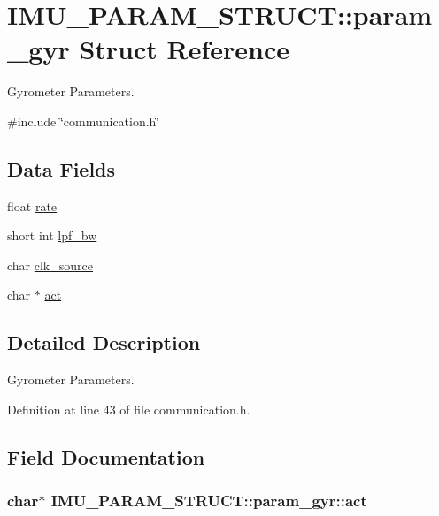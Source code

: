 \hypertarget{structIMU__PARAM__STRUCT_1_1param__gyr}{\section{I\-M\-U\-\_\-\-P\-A\-R\-A\-M\-\_\-\-S\-T\-R\-U\-C\-T\-:\-:param\-\_\-gyr Struct Reference}
\label{structIMU__PARAM__STRUCT_1_1param__gyr}
}


Gyrometer Parameters.  




{\ttfamily \#include \char`\"{}communication.\-h\char`\"{}}

\subsection*{Data Fields}
\begin{DoxyCompactItemize}
\item 
float \hyperlink{structIMU__PARAM__STRUCT_1_1param__gyr_a5aa70e1e9634411c89aacfbc570cc91c}{rate}
\item 
short int \hyperlink{structIMU__PARAM__STRUCT_1_1param__gyr_aa612f7299b43a1bf1fc597688c2fa02d}{lpf\-\_\-bw}
\item 
char \hyperlink{structIMU__PARAM__STRUCT_1_1param__gyr_aca3b791cb480f2da4703d4c256a7de48}{clk\-\_\-source}
\item 
char $\ast$ \hyperlink{structIMU__PARAM__STRUCT_1_1param__gyr_a909d153e794ec443be04625ce00e4178}{act}
\end{DoxyCompactItemize}


\subsection{Detailed Description}
Gyrometer Parameters. 

Definition at line 43 of file communication.\-h.



\subsection{Field Documentation}
\hypertarget{structIMU__PARAM__STRUCT_1_1param__gyr_a909d153e794ec443be04625ce00e4178}{
\subsubsection[{act}]{\setlength{\rightskip}{0pt plus 5cm}char$\ast$ I\-M\-U\-\_\-\-P\-A\-R\-A\-M\-\_\-\-S\-T\-R\-U\-C\-T\-::param\-\_\-gyr\-::act}}\label{structIMU__PARAM__STRUCT_1_1param__gyr_a909d153e794ec443be04625ce00e4178}


